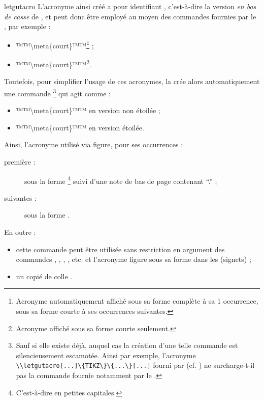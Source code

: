 \documentclass{letgut}
\begin{document}
\begin{docCommand}{letgutacro}{}
  L'acronyme ainsi créé a pour identifiant , c'est-à-dire
  la version \emph{en bas de casse} de , et peut donc
  être employé au moyen des commandes fournies par le , par
  exemple :
  \begin{itemize}
  \item ™\ac{™\meta{court}™}™\footnote{Acronyme automatiquement affiché sous sa
      forme complète à sa 1\iere{} occurrence, sous sa forme courte à ses
      occurrences suivantes.} ;
  \item ™\acs{™\meta{court}™}™\footnote{Acronyme affiché sous sa forme courte
      seulement.}.
  \end{itemize}
  Toutefois, pour simplifier l'usage de ces acronymes, la  crée
  alors automatiquement une commande %
  \footnote{%
    Sauf si elle existe déjà, auquel cas la création d'une telle commande est
    silencieusement escamotée. Ainsi par exemple, l'acronyme
    \lstinline+\\letgutacro[...]\{TIKZ\}\{...\}[...]+
    fourni par  (cf. ) ne surcharge-t-il
    pas la commande  fournie notamment par le
    .%
  }
  qui agit comme :
  \begin{itemize}
  \item ™\ac{™\meta{court}™}™ en version non étoilée ;
  \item ™\acs{™\meta{court}™}™ en version étoilée.
  \end{itemize}
\end{docCommand}
Ainsi, l'acronyme utilisé via  figure, pour ses
occurrences :
\begin{description}
\item[première :] sous la forme \footnote{C'est-à-dire
     en petites capitales.} suivi d'une note de bas de
  page contenant \enquote{.} ;
\item[suivantes :] sous la forme .
\end{description}

En outre :
\begin{itemize}
\item cette commande peut être utilisée sans restriction en argument des
  commandes , , ,
  , etc. et l'acronyme figure sous sa forme  dans
  les  (signets) ;
\item un copié de  colle .
\end{itemize}
\end{document}

